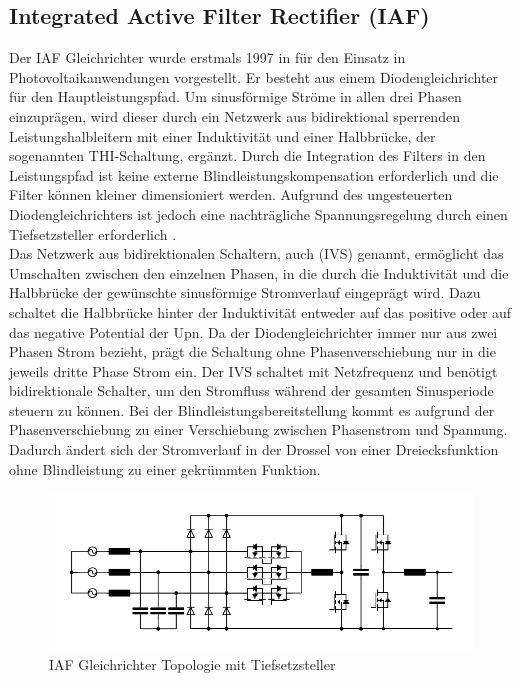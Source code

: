 	\subsection{Integrated Active Filter Rectifier (IAF)} \label{sec:IAF}
	Der \gls{IAF} Gleichrichter wurde erstmals 1997 in \cite{IAFfirst} für den Einsatz in Photovoltaikanwendungen vorgestellt. Er besteht aus einem Diodengleichrichter für den Hauptleistungspfad. Um sinusförmige Ströme in allen drei Phasen einzuprägen, wird dieser durch ein Netzwerk aus bidirektional sperrenden Leistungshalbleitern mit einer Induktivität und einer Halbbrücke, der sogenannten \gls{THI}-Schaltung, ergänzt. Durch die Integration des Filters in den Leistungspfad ist keine externe Blindleistungskompensation erforderlich und die Filter können kleiner dimensioniert werden. Aufgrund des ungesteuerten Diodengleichrichters ist jedoch eine nachträgliche Spannungsregelung durch einen Tiefsetzsteller erforderlich \cite{ThesisSchrittwieserBuckTypePFC_2017}.\\
	Das Netzwerk aus bidirektionalen Schaltern, auch  (\gls{IVS}) genannt, ermöglicht das Umschalten zwischen den einzelnen Phasen, in die durch die Induktivität und die Halbbrücke der gewünschte sinusförmige Stromverlauf eingeprägt wird. Dazu schaltet die Halbbrücke hinter der Induktivität entweder auf das positive oder auf das negative Potential der \gls{Upn}. Da der Diodengleichrichter immer nur aus zwei Phasen Strom bezieht, prägt die Schaltung ohne Phasenverschiebung nur in die jeweils dritte Phase Strom ein. Der \gls{IVS} schaltet mit Netzfrequenz und benötigt bidirektionale Schalter, um den Stromfluss während der gesamten Sinusperiode steuern zu können. Bei der Blindleistungsbereitstellung kommt es aufgrund der Phasenverschiebung zu einer Verschiebung zwischen Phasenstrom und Spannung. Dadurch ändert sich der Stromverlauf in der Drossel von einer Dreiecksfunktion ohne Blindleistung zu einer gekrümmten Funktion.
	\begin{figure}
		\centering
		\includegraphics[width=0.9\linewidth]{content/Grafiken/IAF}
		\caption{\gls{IAF} Gleichrichter Topologie mit Tiefsetzsteller}
		\label{fig:iaf}
	\end{figure}
	
